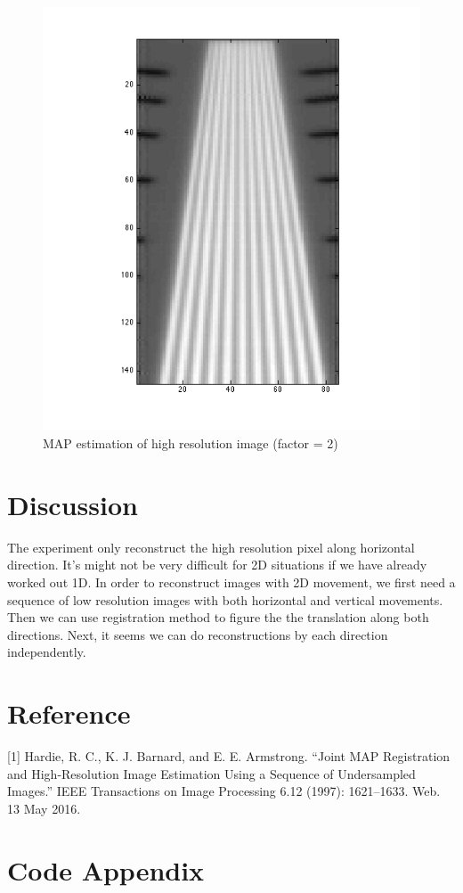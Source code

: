 \documentclass{article}
\begin{document}
\begin{figure}[H]
\centering
\includegraphics[width = 1\textwidth]{result}
\caption{MAP estimation of high resolution image (factor = 2)} \label{result}
\end{figure}

\section{Discussion}
The experiment only reconstruct the high resolution pixel along horizontal direction. It's might not be very difficult for 2D situations if we have already worked out 1D. In order to reconstruct images with 2D movement, we first need a sequence of low resolution images with both horizontal and vertical movements. Then we can use registration method to figure the the translation along both directions. Next, it seems we can do reconstructions by each direction independently. 

\section{Reference}
[1] Hardie, R. C., K. J. Barnard, and E. E. Armstrong. “Joint MAP Registration and High-Resolution Image Estimation Using a Sequence of Undersampled Images.” IEEE Transactions on Image Processing 6.12 (1997): 1621–1633. Web. 13 May 2016.

\newpage
\section{Code Appendix}





\end{document}
